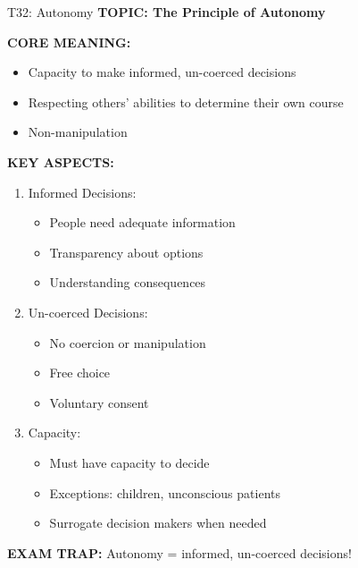 \documentclass[8pt]{beamer}
\begin{document}
	\begin{frame}{T32: Autonomy}
		\fontsize{6.5}{7.5}\selectfont
		\textbf{TOPIC: The Principle of Autonomy}
		
		\vspace{0.1cm}
		\textbf{CORE MEANING:}
		\begin{itemize}
			\item Capacity to make informed, un-coerced decisions
			\item Respecting others' abilities to determine their own course
			\item Non-manipulation
		\end{itemize}
		
		\vspace{0.1cm}
		\textbf{KEY ASPECTS:}
		\begin{enumerate}
			\item \textcolor{myblue}{Informed Decisions:}
			\begin{itemize}
				\item People need adequate information
				\item Transparency about options
				\item Understanding consequences
			\end{itemize}
			\item \textcolor{myblue}{Un-coerced Decisions:}
			\begin{itemize}
				\item No coercion or manipulation
				\item Free choice
				\item Voluntary consent
			\end{itemize}
			\item \textcolor{myblue}{Capacity:}
			\begin{itemize}
				\item Must have capacity to decide
				\item Exceptions: children, unconscious patients
				\item Surrogate decision makers when needed
			\end{itemize}
		\end{enumerate}
		
		\textcolor{myred}{\textbf{EXAM TRAP:}} Autonomy = \textcolor{myblue}{informed, un-coerced decisions}!
	\end{frame}
	
\end{document}
